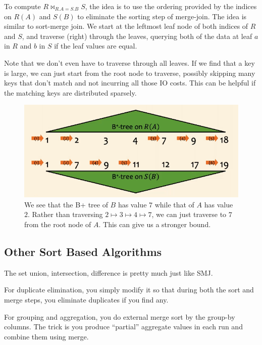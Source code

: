 \documentclass{article}
\begin{document}
    \begin{definition}
      To compute $R \bowtie_{R.A = S.B} S$, the idea is to use the ordering provided by the indices on $R(A)$ and $S(B)$ to eliminate the sorting step of merge-join. The idea is similar to sort-merge join. We start at the leftmost leaf node of both indices of $R$ and $S$, and traverse (right) through the leaves, querying both of the data at leaf $a$ in $R$ and $b$ in $S$ if the leaf values are equal. 

      Note that we don't even have to traverse through all leaves. If we find that a key is large, we can just start from the root node to traverse, possibly skipping many keys that don't match and not incurring all those IO costs. This can be helpful if the matching keys are distributed sparsely.

      \begin{figure}[H]
        \centering 
        \includegraphics[scale=0.4]{img/zig_zag.png}
        \caption{We see that the B+ tree of $B$ has value $7$ while that of $A$ has value $2$. Rather than traversing $2 \mapsto 3 \mapsto 4 \mapsto 7$, we can just traverse to $7$ from the root node of $A$. This can give us a stronger bound. } 
        \label{fig:zig_zag}
      \end{figure}
    \end{definition}

  \subsection{Other Sort Based Algorithms}

    The set union, intersection, difference is pretty much just like SMJ. 

    For duplicate elimination, you simply modify it so that during both the sort and merge steps, you eliminate duplicates if you find any. 

    For grouping and aggregation, you do external merge sort by the group-by columns. The trick is you produce ``partial'' aggregate values in each run and combine them using merge. 
\end{document}
